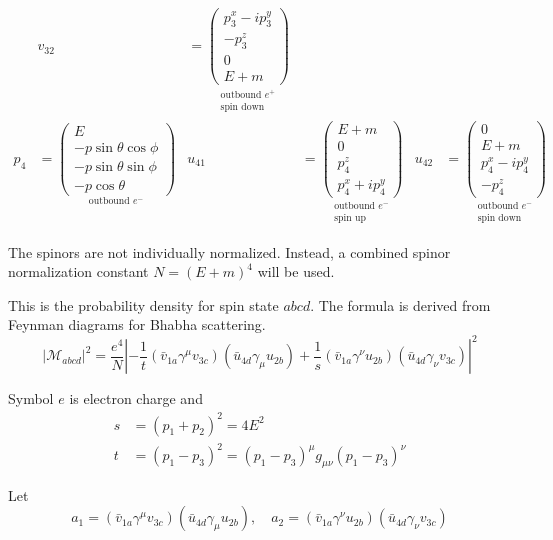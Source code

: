 \documentclass[12pt]{article}
\begin{document}
\begin{align*}
& v_{32}&=\underset{\substack{\text{outbound $e^+$}\\\text{spin down}}}
{\begin{pmatrix}p_3^x-ip_3^y\\-p_3^z\\0\\E+m\end{pmatrix}}
\\[1ex]
p_4&=\underset{\text{outbound $e^-$}}
{\begin{pmatrix}E\\-p\sin\theta\cos\phi\\-p\sin\theta\sin\phi\\-p\cos\theta\end{pmatrix}}
& u_{41}&=
\underset{\substack{\text{outbound $e^-$}\\\text{spin up}}}
{\begin{pmatrix}E+m\\0\\p_4^z\\p_4^x+ip_4^y\end{pmatrix}}
& u_{42}&=\underset{\substack{\text{outbound $e^-$}\\\text{spin down}}}
{\begin{pmatrix}0\\E+m\\p_4^x-ip_4^y\\-p_4^z\end{pmatrix}}
\end{align*}
\fi

The spinors are not individually normalized.
Instead, a combined spinor normalization constant $N=(E+m)^4$ will be used.

\bigskip
This is the probability density for spin state $abcd$.
The formula is derived from Feynman diagrams for Bhabha scattering.
\begin{equation*}
|\mathcal{M}_{abcd}|^2=\frac{e^4}{N}
\left|
-\frac{1}{t}(\bar{v}_{1a}\gamma^\mu v_{3c})(\bar{u}_{4d}\gamma_\mu u_{2b})
+\frac{1}{s}(\bar{v}_{1a}\gamma^\nu u_{2b})(\bar{u}_{4d}\gamma_\nu v_{3c})
\right|^2
\end{equation*}

Symbol $e$ is electron charge and
\begin{align*}
s&=(p_1+p_2)^2=4E^2
\\
t&=(p_1-p_3)^2=(p_1-p_3)^\mu g_{\mu\nu}(p_1-p_3)^\nu
\end{align*}

Let
\begin{equation*}
a_1=(\bar{v}_{1a}\gamma^\mu v_{3c})(\bar{u}_{4d}\gamma_\mu u_{2b}),
\quad
a_2=(\bar{v}_{1a}\gamma^\nu u_{2b})(\bar{u}_{4d}\gamma_\nu v_{3c})
\end{equation*}
\end{document}
